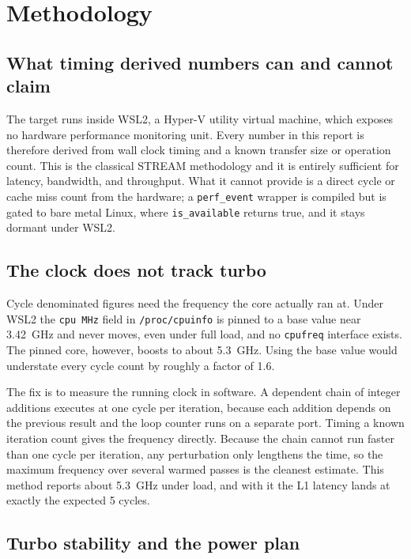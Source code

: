 \chapter{Methodology}

\section{What timing derived numbers can and cannot claim}

The target runs inside WSL2, a Hyper-V utility virtual machine, which exposes no
hardware performance monitoring unit. Every number in this report is therefore
derived from wall clock timing and a known transfer size or operation count.
This is the classical STREAM methodology and it is entirely sufficient for
latency, bandwidth, and throughput. What it cannot provide is a direct cycle or
cache miss count from the hardware; a \texttt{perf\_event} wrapper is compiled
but is gated to bare metal Linux, where \texttt{is\_available} returns true, and
it stays dormant under WSL2.

\section{The clock does not track turbo}

Cycle denominated figures need the frequency the core actually ran at. Under
WSL2 the \texttt{cpu MHz} field in \texttt{/proc/cpuinfo} is pinned to a base
value near \SI{3.42}{\giga\hertz} and never moves, even under full load, and no
\texttt{cpufreq} interface exists. The pinned core, however, boosts to about
\SI{5.3}{\giga\hertz}. Using the base value would understate every cycle count
by roughly a factor of \num{1.6}.

The fix is to measure the running clock in software. A dependent chain of
integer additions executes at one cycle per iteration, because each addition
depends on the previous result and the loop counter runs on a separate port.
Timing a known iteration count gives the frequency directly. Because the chain
cannot run faster than one cycle per iteration, any perturbation only lengthens
the time, so the maximum frequency over several warmed passes is the cleanest
estimate. This method reports about \SI{5.3}{\giga\hertz} under load, and with
it the L1 latency lands at exactly the expected 5 cycles.

\section{Turbo stability and the power plan}

